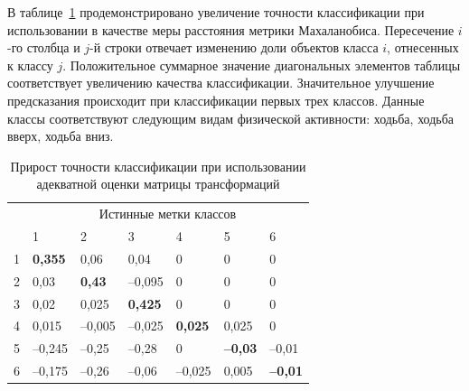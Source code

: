	В таблице~\ref{ch5:tbl:improvement} продемонстрировано увеличение точности классификации при использовании в качестве меры расстояния метрики Махаланобиса.
	Пересечение $i$-го столбца и $j$-й строки отвечает изменению доли объектов класса $i$, отнесенных к классу $j$. Положительное суммарное значение диагональных элементов таблицы соответствует увеличению качества классификации. Значительное улучшение предсказания происходит при классификации первых трех классов.
	Данные классы соответствуют следующим видам физической активности: ходьба, ходьба вверх, ходьба вниз.
	
	\begin{table}[!h]
		\centering
		\caption{Прирост точности классификации при использовании адекватной оценки матрицы трансформаций}
		\label{ch5:tbl:improvement}
		\begin{tabular}{|l|l|l|l|l|l|l|}
			\hline
			\multirow{2}{*}{} & \multicolumn{6}{c|}{Истинные метки классов}       \\ \cline{2-7}
			& 1      & 2      & 3      & 4      & 5     & 6     \\ \hline
			1   & \textbf{0,355}  & 0,06   & 0,04   & 0      & 0     & 0     \\ \hline
			2   & 0,03   & \textbf{0,43}   & --0,095 & 0      & 0     & 0     \\ \hline
			3   & 0,02   & 0,025  & \textbf{0,425}  & 0      & 0     & 0     \\ \hline
			4   & 0,015  & --0,005 & --0,025 & \textbf{0,025}  & 0,025 & 0     \\ \hline
			5   & --0,245 & --0,25  & --0,28  & 0      & \textbf{--0,03} & --0,01 \\ \hline
			6   & --0,175 & --0,26  & --0,06  & --0,025 & 0,005 & \textbf{--0,01} \\ \hline
		\end{tabular}
	\end{table}
	